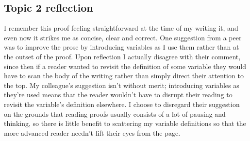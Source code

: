 \documentclass[11pt, letterpaper]{article}
\begin{document}
\subsection*{Topic 2 reflection}
I remember this proof feeling straightforward at the time of my writing it, and even now it strikes me as 
concise, clear and correct. One suggestion from a peer was to improve the prose by introducing variables as I use them
rather than at the outset of the proof. Upon reflection I actually disagree with their comment, since then if a reader 
wanted to revisit the definition of some variable they would have to scan the body of the writing rather than simply 
direct their attention to the top. My colleague's suggestion isn't without merit; introducing variables as they're 
used means that the reader wouldn't have to disrupt their reading to revisit the variable's definition elsewhere. I 
choose to disregard their suggestion on the grounds that reading proofs usually consists of a lot of pausing and 
thinking, so there is little benefit to scattering my variable definitions so that the more advanced reader needn't 
lift their eyes from the page. 
\newpage
\end{document}
